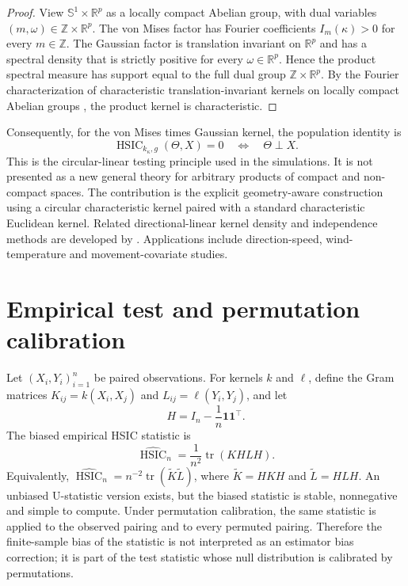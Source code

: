 \documentclass[11pt]{article}
\newcommand{\Sone}{\mathbb S^1}
\newcommand{\R}{\mathbb R}
\newcommand{\HSIC}{\operatorname{HSIC}}
\newcommand{\tr}{\operatorname{tr}}
\begin{document}
\begin{proof}
View \(\Sone\times\R^p\) as a locally compact Abelian group, with dual variables \((m,\omega)\in\mathbb Z\times\R^p\).  The von Mises factor has Fourier coefficients \(I_m(\kappa)>0\) for every \(m\in\mathbb Z\).  The Gaussian factor is translation invariant on \(\R^p\) and has a spectral density that is strictly positive for every \(\omega\in\R^p\).  Hence the product spectral measure has support equal to the full dual group \(\mathbb Z\times\R^p\).  By the Fourier characterization of characteristic translation-invariant kernels on locally compact Abelian groups \citep{berg1984harmonic,fukumizu2009groups,sriperumbudur2010hilbert,sriperumbudur2011universality}, the product kernel is characteristic.
\end{proof}

Consequently, for the von Mises times Gaussian kernel, the population identity is
\[
  \HSIC_{k_\kappa,g}(\Theta,X)=0
  \quad\Longleftrightarrow\quad
  \Theta\perp X.
\]
This is the circular-linear testing principle used in the simulations.  It is not presented as a new general theory for arbitrary products of compact and non-compact spaces.  The contribution is the explicit geometry-aware construction using a circular characteristic kernel paired with a standard characteristic Euclidean kernel.  Related directional-linear kernel density and independence methods are developed by \citet{garciaportugues2013kde,garciaportugues2014directionallinear}.  Applications include direction-speed, wind-temperature and movement-covariate studies.

\section{Empirical test and permutation calibration}

Let \((X_i,Y_i)_{i=1}^n\) be paired observations.  For kernels \(k\) and \(\ell\), define the Gram matrices \(K_{ij}=k(X_i,X_j)\) and \(L_{ij}=\ell(Y_i,Y_j)\), and let
\[
  H=I_n-\frac{1}{n}\mathbf 1\mathbf 1^\top.
\]
The biased empirical HSIC statistic is
\[
  \widehat{\HSIC}_n=\frac{1}{n^2}\tr(KHLH).
\]
Equivalently, \(\widehat{\HSIC}_n=n^{-2}\tr(\widetilde K\widetilde L)\), where \(\widetilde K=HKH\) and \(\widetilde L=HLH\).  An unbiased U-statistic version exists, but the biased statistic is stable, nonnegative and simple to compute.  Under permutation calibration, the same statistic is applied to the observed pairing and to every permuted pairing.  Therefore the finite-sample bias of the statistic is not interpreted as an estimator bias correction; it is part of the test statistic whose null distribution is calibrated by permutations.
\end{document}
